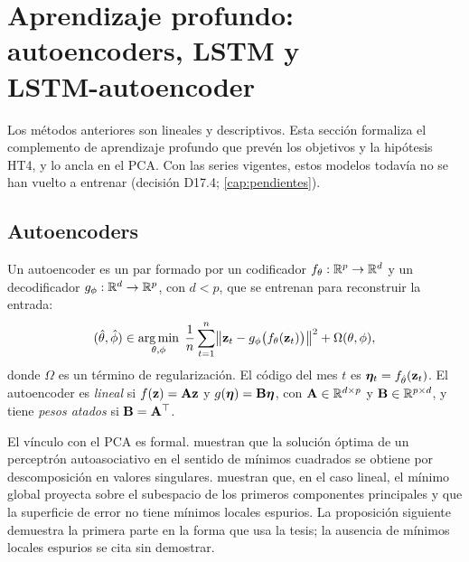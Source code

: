 \section[Aprendizaje profundo]{Aprendizaje profundo: autoencoders, LSTM y\texorpdfstring{\\}{} LSTM-autoencoder}
\label{sec:dl}

Los métodos anteriores son lineales y descriptivos. Esta sección formaliza el complemento de
aprendizaje profundo que prevén los objetivos  y la hipótesis
HT4, y lo ancla en el PCA. Con las \nSeries{} series vigentes, estos modelos todavía no se han
vuelto a entrenar (decisión D17.4; \cref{cap:pendientes}).

\subsection{Autoencoders}

\begin{definicion}[Autoencoder]\label{def:ae}
Un autoencoder es un par formado por un codificador $f_\theta:\mathbb{R}^p\to\mathbb{R}^d$ y un decodificador
$g_\phi:\mathbb{R}^d\to\mathbb{R}^p$, con $d<p$, que se entrenan para reconstruir la entrada:
\begin{equation}\label{eq:ae}
  (\hat\theta,\hat\phi)\in\operatorname*{arg\,min}_{\theta,\phi}\;\frac1n\sum_{t=1}^{n}
  \bigl\lVert\mathbf{z}_t-g_\phi\bigl(f_\theta(\mathbf{z}_t)\bigr)\bigr\rVert^2+\Omega(\theta,\phi),
\end{equation}
donde $\Omega$ es un término de regularización. El código del mes $t$ es
$\boldsymbol{\eta}_t=f_{\hat\theta}(\mathbf{z}_t)$. El autoencoder es \emph{lineal} si $f(\mathbf{z})=\mathbf{A}\mathbf{z}$ y
$g(\boldsymbol{\eta})=\mathbf{B}\boldsymbol{\eta}$, con $\mathbf{A}\in\mathbb{R}^{d\times p}$ y $\mathbf{B}\in\mathbb{R}^{p\times d}$, y tiene \emph{pesos
atados} si $\mathbf{B}=\mathbf{A}^{\top}$.
\end{definicion}

El vínculo con el PCA es formal. \textcite{bourlard_kamp_1988} muestran que la solución
óptima de un perceptrón autoasociativo en el sentido de mínimos cuadrados se obtiene por
descomposición en valores singulares. \textcite{baldi_hornik_1989} muestran que, en el caso lineal,
el mínimo global proyecta sobre el subespacio de los primeros componentes principales y que la
superficie de error no tiene mínimos locales espurios. La proposición siguiente demuestra la
primera parte en la forma que usa la tesis; la ausencia de mínimos locales espurios se cita sin
demostrar.

